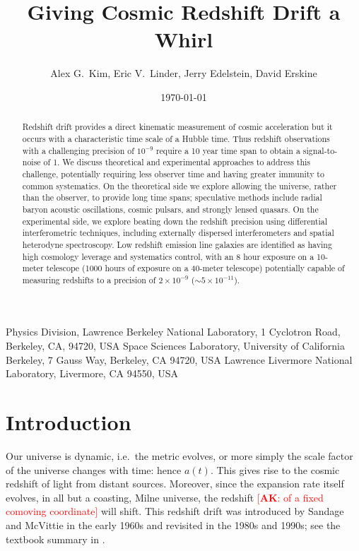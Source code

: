 \documentclass[preprint2, 10pt]{aastex}
\newcommand{\alex}[1]{\textcolor{red}{[{\bf AK}: #1]}}
\begin{document}
\title{Giving Cosmic Redshift Drift a Whirl} 
\author{Alex G.\ Kim, Eric V.\ Linder, Jerry Edelstein, David Erskine}
{
Physics Division, Lawrence Berkeley National Laboratory, 1 Cyclotron Road, Berkeley, CA, 94720, USA}
{
Space Sciences Laboratory, University of California Berkeley, 7 Gauss Way, Berkeley, CA 94720, USA
}
{
Lawrence Livermore National Laboratory, Livermore,
CA 94550, USA
}

\date{\today}

\begin{abstract} 
Redshift drift provides a direct kinematic measurement of cosmic acceleration 
but it occurs with a characteristic time scale of a Hubble time.  Thus 
redshift observations with a challenging precision of $10^{-9}$ require a 
10 year time span to obtain a signal-to-noise of 1. We discuss theoretical 
and experimental approaches to address this challenge, potentially requiring 
less observer time and having greater immunity to common systematics.  On 
the theoretical side we explore allowing the universe, rather than the 
observer, to provide long time spans; speculative methods include radial 
baryon acoustic oscillations, cosmic pulsars, and strongly lensed quasars. 
On the experimental side, we explore beating down the redshift precision 
using differential interferometric techniques, including externally 
dispersed interferometers and spatial heterodyne spectroscopy. Low 
redshift emission line galaxies are identified as having high cosmology 
leverage and systematics control, with an 8 hour exposure on a 10-meter 
telescope (1000 hours of exposure on a 40-meter telescope) potentially 
capable of measuring redshifts to a precision of $2\times 10^{-9}$ 
($\sim5\times 10^{-11}$). 
\end{abstract}




\section{Introduction} \label{Sec:intro} 

Our universe is dynamic, i.e.\ the metric evolves, or more simply the 
scale factor of the universe changes with time: hence $a(t)$.  This 
gives rise to the cosmic redshift of light from distant sources.  Moreover, 
since the expansion rate itself evolves, in all but a coasting, Milne 
universe, the redshift \alex{of a fixed comoving coordinate} will shift.  This redshift drift was 
introduced by Sandage \citep{sandage} and McVittie \citep{mcvittie} in the 
early 1960s and revisited in the 1980s and 1990s; see the textbook 
summary in \citet{fpoc}. 
\end{document}
